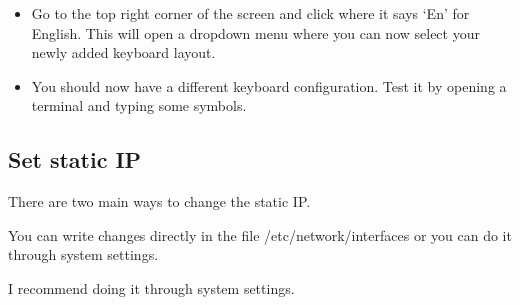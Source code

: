 \documentclass{article}
\begin{document}
\begin{itemize}
\item Go to the top right corner of the screen and click where it says ‘En’ for English. This will open a dropdown menu where you can now select your newly added keyboard layout.
\begin{center}
\end{center} 
\item You should now have a different keyboard configuration. Test it by opening a terminal and typing some symbols.
\end{itemize}

\subsection{Set static IP}
There are two main ways to change the static IP. 

You can write changes directly in the file /etc/network/interfaces or you can do it through system settings. 

I recommend doing it through system settings. 
\end{document}
